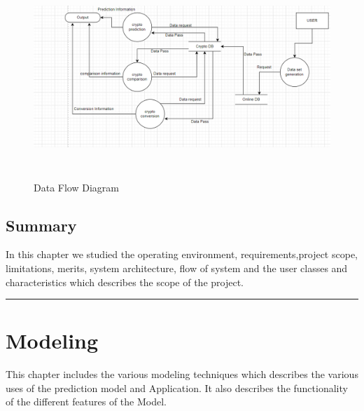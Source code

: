 \documentclass[openany,12pt]{report}
\begin{document}
\begin{figure}[H]
\centering
\includegraphics[width=6in,height=3in]{DataFlow .png}
\caption{Data Flow Diagram}
\end{figure}


\section{Summary}
 In this chapter we studied the operating environment, requirements,project scope, limitations, merits, system architecture, flow of system and the user classes and characteristics which describes the scope of the project. 
 \vfill
\hrule

\chapter{Modeling}
 This chapter includes the various modeling techniques which describes the various uses of the prediction model and Application. It also describes the functionality of the different features of the Model.
\end{document}

